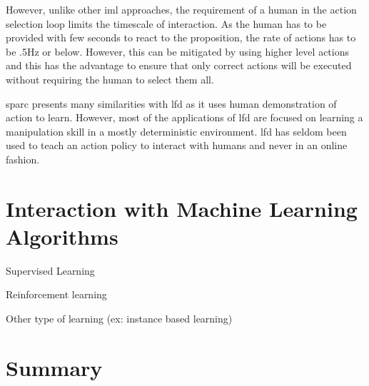 However, unlike other \gls{iml} approaches, the requirement of a human in the action selection loop limits the timescale of interaction. As the human has to be provided with few seconds to react to the proposition, the rate of actions has to be .5Hz or below. However, this can be mitigated by using higher level actions and this has the advantage to ensure that only correct actions will be executed without requiring the human to select them all.

\gls{sparc} presents many similarities with \acrlong{lfd} as it uses human demonstration of action to learn. However, most of the applications of \gls{lfd} \citep{argall2009survey,billard2008robot} are focused on learning a manipulation skill in a mostly deterministic environment. \gls{lfd} has seldom been used to teach an action policy to interact with humans \cite{liu2014train,sequeira2016discovering} and never in an online fashion.

\section{Interaction with Machine Learning Algorithms}

Supervised Learning

Reinforcement learning 

Other type of learning (ex: instance based learning)

\section{Summary}
    
    

